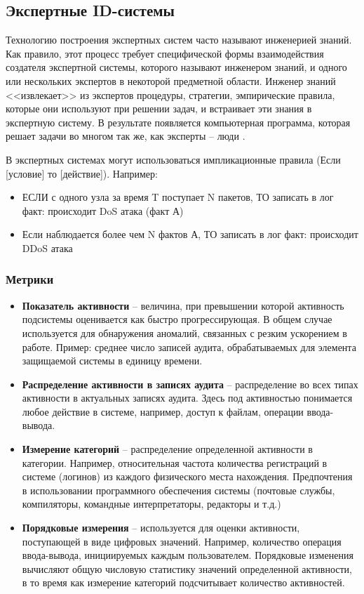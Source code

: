 \subsection{Экспертные ID-системы}

Технологию построения экспертных систем часто называют инженерией знаний. Как правило, этот процесс требует специфической формы взаимодействия создателя экспертной системы, которого называют инженером знаний, и одного или нескольких экспертов в некоторой предметной области.  Инженер знаний <<извлекает>> из экспертов процедуры, стратегии,  эмпирические правила, которые они используют при решении задач, и  встраивает эти знания в экспертную систему. В результате появляется   компьютерная программа, которая решает задачи во многом так же, как   эксперты -- люди \autocite{ExpertSystems}.

В экспертных системах могут использоваться импликационные правила (Если [условие] то [действие]). Например:
\begin{itemize}
	\item ЕСЛИ с одного узла за время T поступает N пакетов, ТО записать в лог факт: происходит DoS атака (факт А)
	\item Если наблюдается более чем N фактов А, ТО записать в лог факт: происходит DDoS атака
\end{itemize}



\subsubsection{Метрики}

\begin{itemize}
	\item \textbf{Показатель активности} -- величина, при превышении которой активность подсистемы оценивается как быстро прогрессирующая. В общем случае используется для обнаружения аномалий, связанных с резким ускорением в работе. Пример: среднее число записей аудита, обрабатываемых для элемента защищаемой системы в единицу времени.
	\item \textbf{Распределение активности в записях аудита} -- распределение во всех типах активности в актуальных записях аудита. Здесь под активностью понимается любое действие в системе, например, доступ к файлам, операции ввода-вывода.
	\item \textbf{Измерение категорий} -- распределение определенной активности в категории\footnotemark. Например, относительная частота количества регистраций в системе (логинов) из каждого физического места нахождения. Предпочтения в использовании программного обеспечения системы (почтовые службы, компиляторы, командные интерпретаторы, редакторы и т.д.)
	\item \textbf{Порядковые измерения} -- используется для оценки активности, поступающей в виде цифровых значений. Например, количество операция ввода-вывода, инициируемых каждым пользователем. Порядковые изменения вычисляют общую числовую статистику значений определенной активности, в то время как измерение категорий подсчитывает количество активностей.
\end{itemize}

